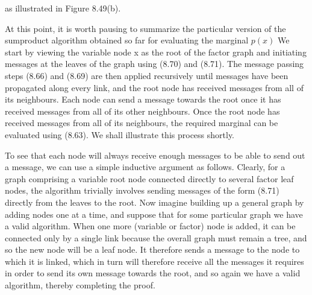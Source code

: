 \documentclass[
  10
]{article}
\begin{document}
as illustrated in Figure 8.49(b).

At this point, it is worth pausing to summarize the particular version
of the sumproduct algorithm obtained so far for evaluating the marginal
\(p ( x )\) We start by viewing the variable node x as the root of the
factor graph and initiating messages at the leaves of the graph using
(8.70) and (8.71). The message passing steps (8.66) and (8.69) are then
applied recursively until messages have been propagated along every
link, and the root node has received messages from all of its
neighbours. Each node can send a message towards the root once it has
received messages from all of its other neighbours. Once the root node
has received messages from all of its neighbours, the required marginal
can be evaluated using (8.63). We shall illustrate this process shortly.

To see that each node will always receive enough messages to be able to
send out a message, we can use a simple inductive argument as follows.
Clearly, for a graph comprising a variable root node connected directly
to several factor leaf nodes, the algorithm trivially involves sending
messages of the form (8.71) directly from the leaves to the root. Now
imagine building up a general graph by adding nodes one at a time, and
suppose that for some particular graph we have a valid algorithm. When
one more (variable or factor) node is added, it can be connected only by
a single link because the overall graph must remain a tree, and so the
new node will be a leaf node. It therefore sends a message to the node
to which it is linked, which in turn will therefore receive all the
messages it requires in order to send its own message towards the root,
and so again we have a valid algorithm, thereby completing the proof.
\end{document}

